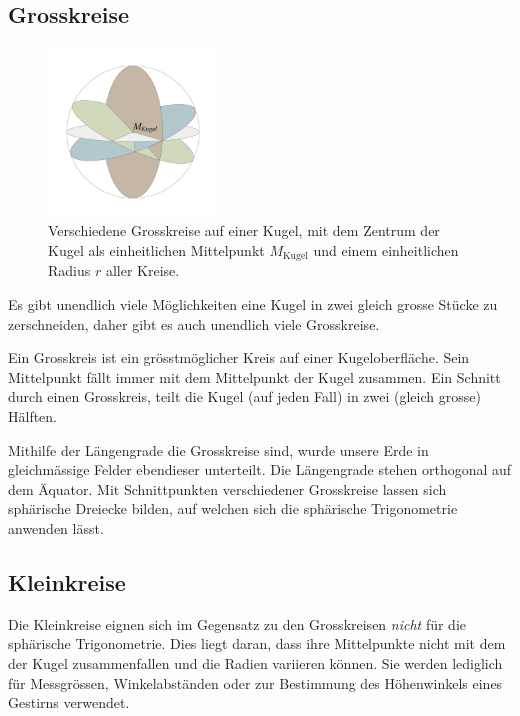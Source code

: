 \begin{refsection}
\subsection{Grosskreise}
\begin{figure}
\centering
\includegraphics[width=0.4\textwidth]{kugel/Grosskreise.jpg}
\caption{Verschiedene Grosskreise auf einer Kugel, mit dem Zentrum
der Kugel als einheitlichen Mittelpunkt $M_{\text{Kugel}}$ und einem
einheitlichen Radius $r$ aller Kreise.}
\end{figure}

Es gibt unendlich viele Möglichkeiten eine Kugel in zwei gleich
grosse Stücke zu zerschneiden, daher gibt es auch unendlich viele
Grosskreise.

\begin{definition}
Ein Grosskreis ist ein grösstmöglicher Kreis auf einer Kugeloberfläche.
Sein Mittelpunkt fällt immer mit dem Mittelpunkt der Kugel zusammen.
Ein Schnitt durch einen Grosskreis, teilt die Kugel (auf jeden Fall)
in zwei (gleich grosse) Hälften.
\label{skript:kugel:satz:Grosskreis}
%
\end{definition}


Mithilfe der Längengrade die Grosskreise sind, wurde unsere Erde
in gleichmässige Felder ebendieser unterteilt. Die Längengrade
stehen orthogonal auf dem Äquator. Mit Schnittpunkten verschiedener
Grosskreise lassen sich sphärische Dreiecke bilden, auf welchen
sich die sphärische Trigonometrie anwenden lässt.


\subsection{Kleinkreise}
Die Kleinkreise eignen sich im Gegensatz zu den Grosskreisen {\em
nicht} für die sphärische Trigonometrie.  Dies liegt daran, dass
ihre Mittelpunkte nicht mit dem der Kugel zusammenfallen und die
Radien variieren können.
Sie werden lediglich für Messgrössen, Winkelabständen oder zur
Bestimmung des Höhenwinkels eines Gestirns verwendet.


\end{refsection}
